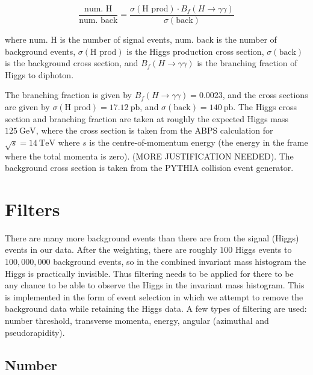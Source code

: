 \documentclass[11pt]{amsart}
\begin{document}
\begin{multicols}{2}
\begin{equation}
  \label{eq:weighting}
  \frac{\text{num. H}}{\text{num. back}} = \frac{\sigma{\left(\text{H prod}\right)} \cdot B_f\left(H\to\gamma\gamma\right)}{\sigma{\left(\text{back}\right)}}
\end{equation}

where $\text{num. H}$ is the number of signal events, $\text{num. back}$ is the number of background events, $\sigma{\left(\text{H prod}\right)}$ is the Higgs production cross section, $\sigma{\left(\text{back}\right)}$ is the background cross section, and $B_f\left(H\to\gamma\gamma\right)$ is the branching fraction of Higgs to diphoton.

The branching fraction is given by $B_f\left(H\to\gamma\gamma\right) = 0.0023$, and the cross sections are given by $\sigma{\left(\text{H prod}\right)} = \SI{17.12}{\pico\barn}$, and $\sigma{\left(\text{back}\right)} = \SI{140}{\pico\barn}$. The Higgs cross section and branching fraction are taken at roughly the expected Higgs mass $\SI{125}{\giga\electronvolt}$, \cite{Higgs} where the cross section is taken from the ABPS calculation for $\sqrt{s} = \SI{14}{\tera\electronvolt}$ where $s$ is the centre-of-momentum energy (the energy in the frame where the total momenta is zero). \cite{HiggsCross1} \cite{COMframe} (MORE JUSTIFICATION NEEDED). The background cross section is taken from the PYTHIA collision event generator.

\section{Filters}
\label{sec:filters}

There are many more background events than there are from the signal (Higgs) events in our data. After the weighting, there are roughly $100$ Higgs events to $100,000,000$ background events, so in the combined invariant mass histogram the Higgs is practically invisible. Thus filtering needs to be applied for there to be any chance to be able to observe the Higgs in the invariant mass histogram. This is implemented in the form of event selection in which we attempt to remove the background data while retaining the Higgs data. A few types of filtering are used: number threshold, transverse momenta, energy, angular (azimuthal and pseudorapidity).

\subsection{Number}


\end{multicols}
\end{document}
